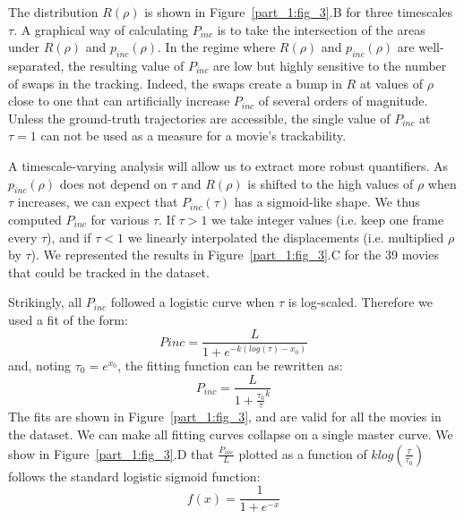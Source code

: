     The distribution $R(\rho)$ is shown in Figure~\ref{part_1:fig_3}.B for three timescales $\tau$. A graphical way of calculating $P_{inc}$ is to take the intersection of the areas under $R(\rho)$ and $p_{inc}(\rho)$. In the regime where $R(\rho)$ and $p_{inc}(\rho)$ are well-separated, the resulting value of $P_{inc}$ are low but highly sensitive to the number of swaps in the tracking. Indeed, the swaps create a bump in $R$  at values of $\rho$ close to one that can artificially increase $P_{inc}$ of several orders of magnitude. Unless the ground-truth trajectories are accessible, the single value of $P_{inc}$ at $\tau=1$ can not be used as a measure for a movie's trackability.

    A timescale-varying analysis will allow us to extract more robust quantifiers. As $p_{inc}(\rho)$ does not depend on $\tau$ and $R(\rho)$ is shifted to the high values of $\rho$ when $\tau$ increases, we can expect that $P_{inc}(\tau)$ has a sigmoid-like shape. We thus computed $P_{inc}$ for various $\tau$. If $\tau>1$ we take integer values (i.e. keep one frame every $\tau$), and if $\tau<1$ we linearly interpolated the displacements (i.e. multiplied $\rho$ by $\tau$). We represented the results in Figure~\ref{part_1:fig_3}.C for the 39 movies that could be tracked in the dataset.

    Strikingly, all $P_{inc}$ followed a logistic curve when $\tau$ is log-scaled. Therefore we used a fit of the form:
    \begin{equation}
        Pinc=\frac{L}{1 + e^{-k(log(\tau)-x_0)}}
    \end{equation}
    and, noting $\tau_0=e^{x_0}$, the fitting function can be rewritten as:
    \begin{equation}
        \label{eq_pinc}
        P_{inc}=\frac{L}{1 + \frac{\tau_0}{\tau}^k}
    \end{equation}
    The fits are shown in Figure~\ref{part_1:fig_3}, and are valid for all the movies in the dataset. We can make all fitting curves collapse on a single master curve. We show in Figure~\ref{part_1:fig_3}.D that $\frac{P_{inc}}{L}$ plotted as a function of $k log(\frac{\tau}{\tau_0})$ follows the standard logistic sigmoid function:
    \begin{equation}
        f(x) =\frac{1}{1+e^{-x}}
    \end{equation}

